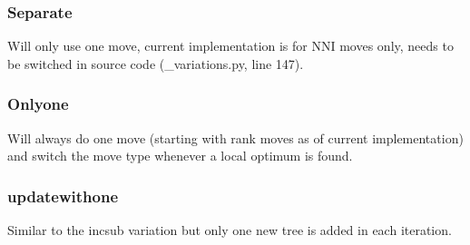 \documentclass[letterpaper,10pt,english]{sphinxmanual}
\begin{document}
\begin{sphinxVerbatim}[commandchars=\\\{\}]
  
\end{sphinxVerbatim}


\subsubsection{Separate}
\label{\detokenize{summary:separate}}\label{\detokenize{summary:var-separate}}
\sphinxAtStartPar
Will only use one move, current implementation is for NNI moves only, needs to be switched in source code (\_variations.py, line 147).

\begin{sphinxVerbatim}[commandchars=\\\{\}]
\end{sphinxVerbatim}


\subsubsection{Onlyone}
\label{\detokenize{summary:onlyone}}\label{\detokenize{summary:var-onlyone}}
\sphinxAtStartPar
Will always do one move (starting with rank moves as of current implementation) and switch the move type whenever a local optimum is found.

\begin{sphinxVerbatim}[commandchars=\\\{\}]
\end{sphinxVerbatim}


\subsubsection{update\sphinxhyphen{}with\sphinxhyphen{}one}
\label{\detokenize{summary:update-with-one}}\label{\detokenize{summary:var-update-with-one}}
\sphinxAtStartPar
Similar to the inc\sphinxhyphen{}sub variation but only one new tree is added in each iteration.
\end{document}

